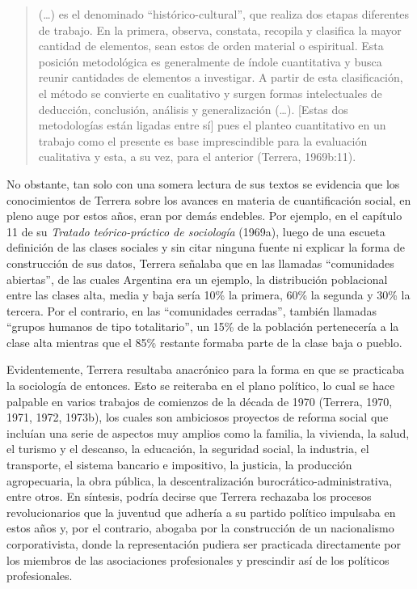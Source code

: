 \begin{quote}
(\dots) es el denominado \enquote{histórico-cultural}, que realiza dos etapas diferentes de trabajo. En la primera, observa, constata, recopila y clasifica la mayor cantidad de elementos, sean estos de orden material o espiritual. Esta posición metodológica es generalmente de índole cuantitativa y busca reunir cantidades de elementos a investigar. A partir de esta clasificación, el método se convierte en cualitativo y surgen formas intelectuales de deducción, conclusión, análisis y generalización (\dots). [Estas dos metodologías están ligadas entre sí] pues el planteo cuantitativo en un trabajo como el presente es base imprescindible para la evaluación cualitativa y esta, a su vez, para el anterior (Terrera, 1969b:11).
\end{quote}

No obstante, tan solo con una somera lectura de sus textos se evidencia que los conocimientos de Terrera sobre los avances en materia de cuantificación social, en pleno auge por estos años, eran por demás endebles. Por ejemplo, en el capítulo 11 de su \emph{Tratado teórico-práctico de sociología} (1969a), luego de una escueta definición de las clases sociales y sin citar ninguna fuente ni explicar la forma de construcción de sus datos, Terrera señalaba que en las llamadas \enquote{comunidades abiertas}, de las cuales Argentina era un ejemplo, la distribución poblacional entre las clases alta, media y baja sería 10\% la primera, 60\% la segunda y 30\% la tercera. Por el contrario, en las \enquote{comunidades cerradas}, también llamadas \enquote{grupos humanos de tipo totalitario}, un 15\% de la población pertenecería a la clase alta mientras que el 85\% restante formaba parte de la clase baja o pueblo.

Evidentemente, Terrera resultaba anacrónico para la forma en que se practicaba la sociología de entonces. Esto se reiteraba en el plano político, lo cual se hace palpable en varios trabajos de comienzos de la década de 1970 (Terrera, 1970, 1971, 1972, 1973b), los cuales son ambiciosos proyectos de reforma social que incluían una serie de aspectos muy amplios como la familia, la vivienda, la salud, el turismo y el descanso, la educación, la seguridad social, la industria, el transporte, el sistema bancario e impositivo, la justicia, la producción agropecuaria, la obra pública, la descentralización burocrático-administrativa, entre otros. En síntesis, podría decirse que Terrera rechazaba los procesos revolucionarios que la juventud que adhería a su partido político impulsaba en estos años y, por el contrario, abogaba por la construcción de un nacionalismo corporativista, donde la representación pudiera ser practicada directamente por los miembros de las asociaciones profesionales y prescindir así de los políticos profesionales.

